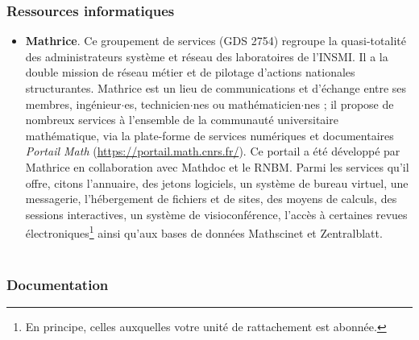 \subsubsection{Ressources informatiques}
\begin{itemize}
\item{\bf Mathrice}.
Ce groupement de services (GDS 2754) 
regroupe la quasi-totalit\'e des administrateurs syst\`eme et r\'eseau des laboratoires de l'INSMI. Il a la double mission de r\'eseau m\'etier et de pilotage d'actions nationales structurantes. Mathrice est un lieu de communications et d'\'echange entre ses membres, ing\'enieur$\cdot$es, technicien$\cdot$nes ou math\'ematicien$\cdot$nes ; il propose de nombreux services \`a l'ensemble de la communaut\'e universitaire math\'ematique, via la plate-forme de services num\'eriques et documentaires {\it Portail Math} (\url{https://portail.math.cnrs.fr/}). Ce portail a \'et\'e d\'evelopp\'e par Mathrice en collaboration avec Mathdoc et le RNBM. Parmi les services qu'il offre, citons l'annuaire, des jetons logiciels, un syst\`eme de bureau virtuel, une messagerie, l'h\'ebergement de fichiers et de sites, des moyens de calculs, des sessions interactives, un syst\`eme de visioconf\'erence,
l'acc\`es \`a certaines
revues \'electroniques\footnote{En principe, celles auxquelles votre unit\'e de rattachement est abonn\'ee.}
 ainsi qu'aux bases de donn\'ees Mathscinet et Zentralblatt. \\
\\

\end{itemize}




\subsubsection{Documentation}

